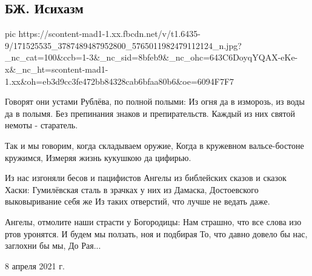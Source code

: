  
 
 
 
 

\subsection{БЖ. Исихазм}


\ifcmt
  pic https://scontent-mad1-1.xx.fbcdn.net/v/t1.6435-9/171525535_3787489487952800_5765011982479112124_n.jpg?_nc_cat=100&ccb=1-3&_nc_sid=8bfeb9&_nc_ohc=643C6DoyqYQAX-eKe-x&_nc_ht=scontent-mad1-1.xx&oh=eb3d9cc3fe472bb84328cab6bfaa80b6&oe=6094F7F7
\fi


Говорят они устами Рублёва, по полной полыми:
Из огня да в изморозь, из воды да в полымя.
Без препинания знаков и препирательств.
Каждый из них святой немоты - старатель.

Так и мы говорим, когда складываем оружие,
Когда в кружевном вальсе-бостоне кружимся,
Измеряя жизнь кукушкою да цифирью.

Из нас изгоняли бесов и пацифистов
Ангелы из библейских сказов и сказок Хаски:
Гумилёвская сталь в зрачках у них из Дамаска,
Достоевского выковыривание себя же
Из таких отверстий, что лучше не ведать даже.

Ангелы, отмолите наши страсти у Богородицы:
Нам страшно, что все слова изо ртов уронятся.
И будем мы ползать, ноя и подбирая
То, что давно довело бы нас, заглохни бы мы,
До Рая...

8 апреля 2021 г.
